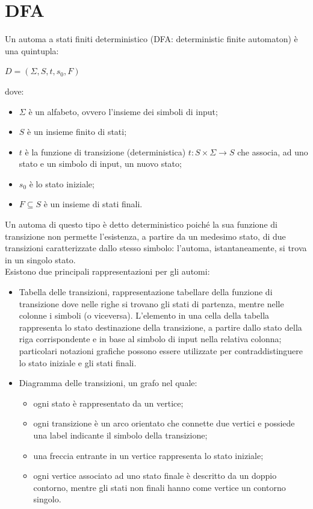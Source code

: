 \section{DFA}
Un automa a stati finiti deterministico (DFA: deterministic finite automaton) è una quintupla:
\begin{center}
	$D = (\Sigma,S,t,s_0,F)$
\end{center}
dove:
\begin{itemize}
\item $\Sigma$ è un alfabeto, ovvero l'insieme dei simboli di input;
\item $S$ è un insieme finito di stati;
\item $t$ è la funzione di transizione (deterministica) $t: S \times \Sigma \rightarrow S$ che associa, ad uno stato e un simbolo di input, un nuovo stato;
\item $s_0$ è lo stato iniziale;
\item $F \subseteq S$ è un insieme di stati finali.
\end{itemize}
Un automa di questo tipo è detto deterministico poiché la sua funzione di transizione non permette l'esistenza, a partire da un medesimo stato, di due transizioni caratterizzate dallo stesso simbolo: l'automa, istantaneamente, si trova in un singolo stato.\\
Esistono due principali rappresentazioni per gli automi:
\begin{itemize}
\item Tabella delle transizioni, rappresentazione tabellare della funzione di transizione dove nelle righe si trovano gli stati di partenza, mentre nelle colonne i simboli (o viceversa). L'elemento in una cella della tabella rappresenta lo stato destinazione della transizione, a partire dallo stato della riga corrispondente e in base al simbolo di input nella relativa colonna; particolari notazioni grafiche possono essere utilizzate per contraddistinguere lo stato iniziale e gli stati finali.
\item Diagramma delle transizioni, un grafo nel quale:
	\begin{itemize}
	\item ogni stato è rappresentato da un vertice;
	\item ogni transizione è un arco orientato che connette due vertici e possiede una label indicante il simbolo della transizione;
	\item una freccia entrante in un vertice rappresenta lo stato iniziale;
	\item ogni vertice associato ad uno stato finale è descritto da un doppio contorno, mentre gli stati non finali hanno come vertice un contorno singolo.
	\end{itemize}
\end{itemize}

